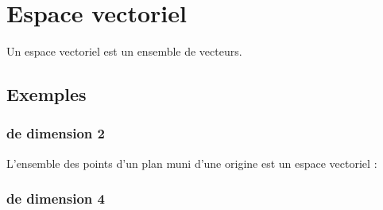 \section{Espace vectoriel}
Un espace vectoriel est un ensemble de vecteurs.
\subsection{Exemples}
\subsubsection{de dimension 2}
L'ensemble des points d'un plan muni d'une origine est un espace vectoriel :
\subsubsection{de dimension 4}
